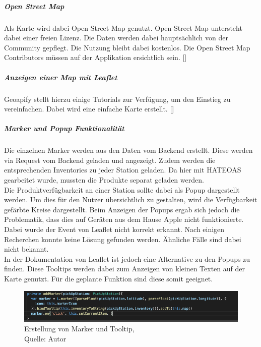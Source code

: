 \subparagraph{Open Street Map}
Als Karte wird dabei Open Street Map genutzt. Open Street Map untersteht dabei einer freien Lizenz. Die Daten werden dabei hauptsächlich von der Community gepflegt. Die Nutzung bleibt dabei kostenlos. Die Open Street Map Contributors müssen auf der Applikation ersichtlich sein.  [\cite{openStreetMap}]
\subparagraph{Anzeigen einer Map mit Leaflet}
Geoapify stellt hierzu einige Tutorials zur Verfügung, um den Einstieg zu vereinfachen. Dabei wird eine einfache Karte erstellt. [\cite{geoapifyLeaflet}]


\subparagraph{Marker und Popup Funktionalität}
Die einzelnen Marker werden aus den Daten vom Backend erstellt. Diese werden via Request vom Backend geladen und angezeigt. Zudem werden die entsprechenden Inventories zu jeder Station geladen. Da hier mit HATEOAS gearbeitet wurde, mussten die Produkte separat geladen werden. \\
Die Produktverfügbarkeit an einer Station sollte dabei als Popup dargestellt werden. Um dies für den Nutzer übersichtlich zu gestalten, wird die Verfügbarkeit gefärbte Kreise dargestellt. 
Beim Anzeigen der Popups ergab sich jedoch die Problematik, dass dies auf Geräten aus dem Hause Apple nicht funktionierte. Dabei wurde der Event von Leaflet nicht korrekt erkannt. Nach einigen Recherchen konnte keine Lösung gefunden werden. Ähnliche Fälle sind dabei nicht bekannt. \\
In der Dokumentation von Leaflet ist jedoch eine Alternative zu den Popups zu finden. Diese Tooltips werden dabei zum Anzeigen von kleinen Texten auf der Karte genutzt. Für die geplante Funktion sind diese somit geeignet. 
\begin{figure}[H]
	\centering
	\includegraphics[width=1\textwidth]{images/tooltipImp.PNG}
	\caption[Erstellung von Marker und Tooltip]{Erstellung von Marker und Tooltip,\\ Quelle: Autor}
	\label{img: tooltip}
\end{figure} 

